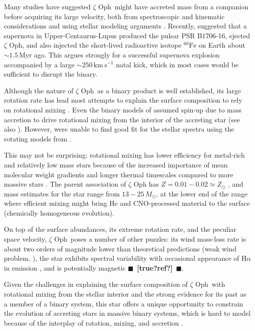 \documentclass[twocolumn,twocolappendix,trackchanges]{aastex63}
\newcommand{\kms}{{\mathrm{km\ s^{-1}}}}
\newcommand{\zoph}{$\zeta$ Oph}
\newcommand{\todo}[1]{{\large $\blacksquare$~\textbf{\color{red}[#1]}}~$\blacksquare$}
\begin{document}
Many studies have suggested \zoph\ might have accreted mass from a
companion before acquiring its large velocity, both from spectroscopic
and kinematic considerations \citep[e.g.,][]{blaauw:93, hoogerwerf:00,
  hoogerwerf:01, tetzlaff:10, neuhauser:20} and using stellar modeling
arguments \citep[e.g.,][]{vanrensbergen:96}. Recently,
\cite{neuhauser:20} suggested that a supernova in
Upper-Centaurus-Lupus produced the pulsar PSR B1706-16, ejected \zoph,
and also injected the short-lived radioactive isotope
$^{60}\mathrm{Fe}$ on Earth about $\sim 1.5$\,Myr ago. This argues
strongly for a successful supernova explosion accompanied by a large
$\sim 250\,\kms$ natal kick, which in most cases would be sufficient
to disrupt the binary.

Although the nature of \zoph\ as a binary product is well
established, its large rotation rate has lead most attempts to explain
the surface composition to rely on rotational mixing
\cite[e.g.,][]{maeder:00}. Even the binary models of
\cite{vanrensbergen:96} assumed spin-up due to mass accretion
\citep[e.g.,][]{packet:81} to drive rotational mixing from the
interior of the accreting star (see also
\citealt{cantiello:07}). However, \cite{villamariz:05} were unable to
find good fit for the stellar spectra using the rotating models from
\cite{meynet:00}.

This may not be surprising: rotational mixing has
lower efficiency for metal-rich and relatively low mass stars because
of the increased importance of mean molecular weight gradients and
longer thermal timescales compared to more massive stars
\citep[e.g.,][]{yoon:06, perna:14}. The parent association of $\zeta$
Oph has $Z=0.01-0.02\simeq Z_\odot$ \citep[e.g.,][]{murphy:21}, and
mass estimates for the star range from $13-25\,M_\odot$, at the
lower end of the range where efficient mixing might bring He and
CNO-processed material to the surface (chemically homogeneous
evolution).

On top of the surface abundances, its extreme rotation rate, and the
peculiar space velocity, \zoph\ poses a number of other
puzzles: its wind mass-loss rate is about two orders of magnitude
lower than theoretical predictions (weak wind problem,
\citealt{marcolino:09}), the star exhibits spectral variability with
occasional appearance of H$\alpha$ in emission
\citep[e.g.,][]{walker:79}, and is potentially magnetic \todo{true?ref?}.

Given the challenges in explaining the surface composition of \zoph\
with rotational mixing from the stellar interior and the strong
evidence for its past as a member of a binary system, this star offers
a unique opportunity to constrain the evolution of accreting stars in
massive binary systems, which is hard to model because of the
interplay of rotation, mixing, and accretion
\citep[e.g.][]{hellings:83, hellings:84, braun:95}.
\end{document}
